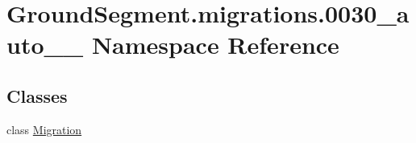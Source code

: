 \hypertarget{namespace_ground_segment_1_1migrations_1_10030__auto__20170125__1955}{}\section{Ground\+Segment.\+migrations.0030\+\_\+auto\+\_\+\_ Namespace Reference}
\label{namespace_ground_segment_1_1migrations_1_10030__auto__20170125__1955}
\subsection*{Classes}
\begin{DoxyCompactItemize}
\item 
class \hyperlink{class_ground_segment_1_1migrations_1_10030__auto__20170125__1955_1_1_migration}{Migration}
\end{DoxyCompactItemize}
